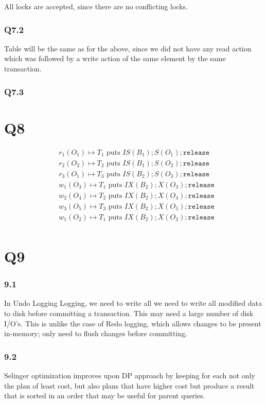 \documentclass{article}
\begin{document}
All locks are accepted, since there are no conflicting locks.

\subsubsection{Q7.2}

Table will be the same as for the above, since we did not have any read action
which was followed by a write action of the same element by the same
transaction.


\subsubsection{Q7.3}


\section{Q8}
\begin{align*}
    &r_1(O_1) \mapsto \text{$T_1$ puts }IS(B_1); S(O_1); \texttt{release} \\
    &r_2(O_2) \mapsto \text{$T_2$ puts }IS(B_1); S(O_2); \texttt{release}\\
    &r_3(O_1) \mapsto \text{$T_3$ puts }IS(B_2); S(O_3); \texttt{release}\\
    &w_1(O_3) \mapsto \text{$T_1$ puts }IX(B_2); X(O_3); \texttt{release}\\
    &w_2(O_4) \mapsto \text{$T_2$ puts }IX(B_2); X(O_4); \texttt{release}\\
    &w_3(O_5) \mapsto \text{$T_3$ puts }IX(B_2); X(O_5); \texttt{release}\\
    &w_1(O_2) \mapsto \text{$T_1$ puts }IX(B_2); X(O_3); \texttt{release}\\
\end{align*}
\section{Q9}
\subsubsection{9.1}
In Undo Logging Logging, we need to write all we need to write all modified
data to disk before committing a transaction.  This may need a large number of disk
I/O’s. This is unlike the case of Redo logging, which allows changes to be
present in-memory; only need to flush changes before committing.

\subsubsection{9.2}
Selinger optimization improves upon DP approach by keeping for
each  not only the plan of least cost, but also plans that have higher
cost but produce a result that is sorted in an order that may
be useful for parent queries.
\end{document}

